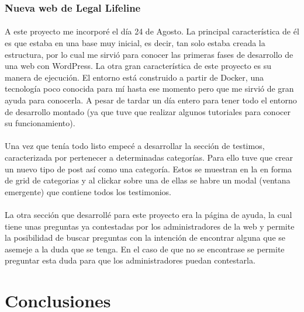 \documentclass[11pt, a4paper,spanish]{article}
\begin{document}
            \subsubsection{Nueva web de Legal Lifeline}

                \paragraph{}
                A este proyecto me incorporé el día 24 de Agosto. La principal característica de él es que estaba en una base muy inicial, es decir, tan solo estaba creada la estructura, por lo cual me sirvió para conocer las primeras fases de desarrollo de una web con WordPress. La otra gran característica de este proyecto es su manera de ejecución. El entorno está construido a partir de Docker, una tecnología poco conocida para mí hasta ese momento pero que me sirvió de gran ayuda para conocerla. A pesar de tardar un día entero para tener todo el entorno de desarrollo montado (ya que tuve que realizar algunos tutoriales para conocer su funcionamiento).

                \paragraph{}
                Una vez que tenía todo listo empecé a desarrollar la sección de testimos, caracterizada por pertenecer a determinadas categorías. Para ello tuve que crear un nuevo tipo de post así como una categoría. Estos se muestran en la en forma de grid de categorias y al clickar sobre una de ellas se habre un modal (ventana emergente) que contiene todos los testimonios.

                \paragraph{}
                La otra sección que desarrollé para este proyecto era la página de ayuda, la cual tiene unas preguntas ya contestadas por los administradores de la web y permite la posibilidad de buscar preguntas con la intención de encontrar alguna que se asemeje a la duda que se tenga. En el caso de que no se encontrase se permite preguntar esta duda para que los administradores puedan contestarla.

    \section{Conclusiones}
\end{document}
